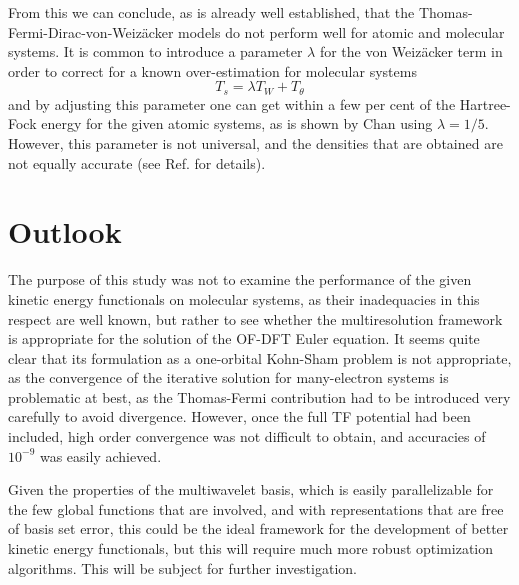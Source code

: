 From this we can conclude, as is already well established, that the Thomas-Fermi-Dirac-von-Weiz\"{a}cker models do
not perform well for atomic and molecular systems. It is common to introduce a parameter $\lambda$ for the von Weiz\"{a}cker
term in order to correct for a known over-estimation for molecular systems
\begin{equation}
    T_s = \lambda T_W + T_\theta
\end{equation}
and by adjusting this parameter one can get within a few per cent of the Hartree-Fock energy for the given atomic systems, 
as is shown by Chan \etal\cite{Chan:2000} using $\lambda=1/5$. However, this parameter is not universal, and the densities 
that are obtained are not equally accurate (see Ref.\cite{Chan:2000} for details).

\section{Outlook}
The purpose of this study was not to examine the performance of the given kinetic energy functionals on molecular
systems, as their inadequacies in this respect are well known, but rather to see whether the multiresolution framework
is appropriate for the solution of the OF-DFT Euler equation. It seems quite clear that its formulation as a one-orbital 
Kohn-Sham problem is not appropriate, as the convergence of the iterative solution for many-electron systems 
is problematic at best, as the Thomas-Fermi contribution had to be introduced very carefully to avoid divergence. However,
once the full TF potential had been included, high order convergence was not difficult to obtain, and accuracies of $10^{-9}$
was easily achieved.

Given the properties of the multiwavelet basis, which is easily parallelizable for the few global functions that are 
involved, and with representations that are free of basis set error, this could be the ideal framework for the development 
of better kinetic energy functionals, but this will require much more robust optimization algorithms. This will be subject
for further investigation.
